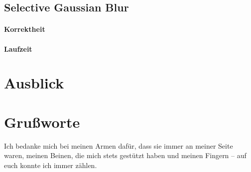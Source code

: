 \documentclass[10pt,a4paper]{article}
\begin{document}





\subsection{Selective Gaussian Blur}
\paragraph{Korrektheit}
\paragraph{Laufzeit}
\section{Ausblick}
\section{Grußworte}
Ich bedanke mich bei meinen Armen dafür, dass sie immer an meiner Seite waren, meinen Beinen, die mich stets gestützt haben und meinen Fingern -- auf euch konnte ich immer zählen.
%
\end{document}
